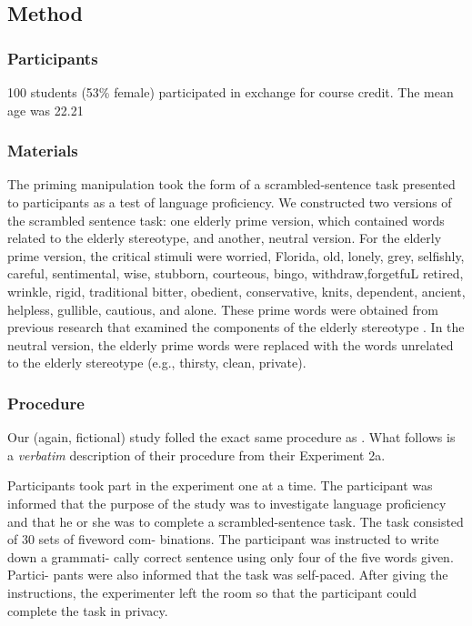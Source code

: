 \documentclass[a4paper,man,natbib,floatsintext]{apa6}\usepackage[]{graphicx}\usepackage[]{color}
\begin{document}
\subsection{Method}

\subsubsection{Participants}

100 students (53\% female) participated in exchange for course credit. The mean age was 22.21

\subsubsection{Materials}

The priming manipulation took the form of a scrambled-sentence task presented to participants as a test of language proficiency. We constructed two versions of the scrambled sentence task: one elderly prime version, which contained words related to the elderly stereotype, and another, neutral version. For the elderly prime version, the critical stimuli were worried, Florida, old, lonely, grey, selfishly, careful, sentimental, wise, stubborn, courteous, bingo, withdraw,forgetfuL retired, wrinkle, rigid, traditional bitter, obedient, conservative, knits, dependent, ancient, helpless, gullible, cautious, and alone. These prime words were obtained from previous research that examined the components of the elderly stereotype \citep{brewer1981perceptions, harris1976myth, mctavish1971perceptions, perdue1990evidence}. In the neutral version, the elderly prime words were replaced with the words unrelated to the elderly stereotype (e.g., thirsty, clean, private).


\subsubsection{Procedure}

Our (again, fictional) study folled the exact same procedure as \cite{bargh1996automaticity}. What follows is a \emph{verbatim} description of their procedure from their Experiment 2a.

Participants took part in the experiment one at a time. The participant was informed that the purpose of the study was to investigate language proficiency and that he or she was to complete a scrambled-sentence task. The task consisted of 30 sets of fiveword com- binations. The participant was instructed to write down a grammati- cally correct sentence using only four of the five words given. Partici- pants were also informed that the task was self-paced. After giving the instructions, the experimenter left the room so that the participant could complete the task in privacy.
\end{document}
